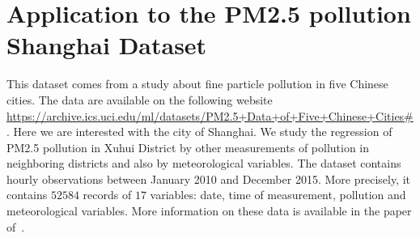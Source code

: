 \section{Application to the PM2.5 pollution Shanghai Dataset}

\label{sub:S5DataChine}

This dataset comes from a study about fine particle pollution in five Chinese cities. The data are available on the following website \url{https://archive.ics.uci.edu/ml/datasets/PM2.5+Data+of+Five+Chinese+Cities#}.
Here we are interested with the city of Shanghai. We study the regression of PM2.5 pollution in Xuhui District by other  measurements of pollution in neighboring districts and also by meteorological variables. The dataset contains  hourly observations between January 2010 and December 2015. More precisely, it contains $52584$ records of $17$ variables: date, time of measurement, pollution and meteorological variables. More information on these data is available in the paper of~\cite{liang2016pm2}.

